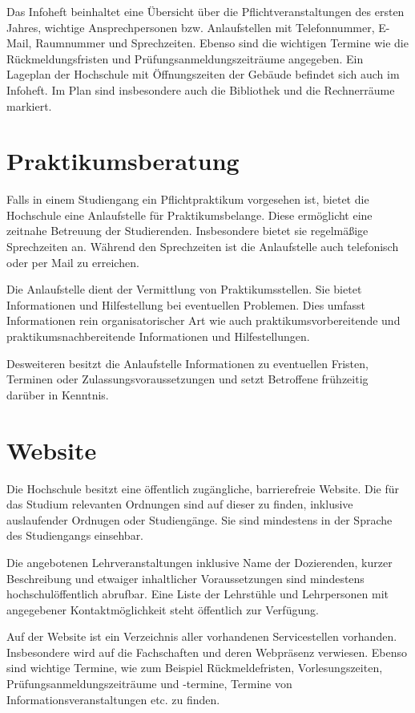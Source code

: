 Das Infoheft beinhaltet eine Übersicht über die Pflichtveranstaltungen des ersten Jahres, wichtige Ansprechpersonen bzw. Anlaufstellen mit Telefonnummer, E-Mail, Raumnummer und Sprechzeiten. Ebenso sind die wichtigen Termine wie die Rückmeldungsfristen und Prüfungsanmeldungszeiträume angegeben. Ein Lageplan der Hochschule mit Öffnungszeiten der Gebäude befindet sich auch im Infoheft. Im Plan sind insbesondere auch die Bibliothek und die Rechnerräume markiert.

\section{Praktikumsberatung}

Falls in einem Studiengang ein Pflichtpraktikum vorgesehen ist, bietet die Hochschule eine Anlaufstelle für Praktikumsbelange. Diese ermöglicht eine zeitnahe Betreuung der Studierenden. Insbesondere bietet sie regelmäßige Sprechzeiten an. Während den Sprechzeiten ist die Anlaufstelle auch telefonisch oder per Mail zu erreichen.

Die Anlaufstelle dient der Vermittlung von Praktikumsstellen. Sie bietet Informationen und Hilfestellung bei eventuellen Problemen. Dies umfasst Informationen rein organisatorischer Art wie auch praktikumsvorbereitende und praktikumsnachbereitende Informationen und Hilfestellungen.

Desweiteren besitzt die Anlaufstelle Informationen zu eventuellen Fristen, Terminen oder Zulassungsvoraussetzungen und setzt Betroffene frühzeitig darüber in Kenntnis.

\section{Website}

Die Hochschule besitzt eine öffentlich zugängliche, barrierefreie Website. Die für das Studium relevanten Ordnungen sind auf dieser zu finden, inklusive auslaufender Ordnugen oder Studiengänge. Sie sind mindestens in der Sprache des Studiengangs einsehbar.

Die angebotenen Lehrveranstaltungen inklusive Name der Dozierenden, kurzer Beschreibung und etwaiger inhaltlicher Voraussetzungen sind mindestens hochschulöffentlich abrufbar. Eine Liste der Lehrstühle und Lehrpersonen mit angegebener Kontaktmöglichkeit steht öffentlich zur Verfügung.

Auf der Website ist ein Verzeichnis aller vorhandenen Servicestellen vorhanden. Insbesondere wird auf die Fachschaften und deren Webpräsenz verwiesen. Ebenso sind wichtige Termine, wie zum Beispiel Rückmeldefristen, Vorlesungszeiten, Prüfungsanmeldungszeiträume und -termine, Termine von Informationsveranstaltungen etc. zu finden.

